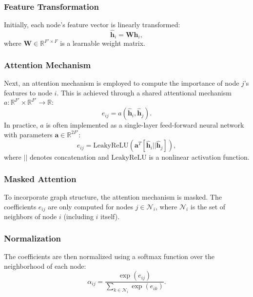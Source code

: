 \documentclass[11pt]{article}
\begin{document}
	\subsubsection{Feature Transformation}
	Initially, each node's feature vector is linearly transformed:
	\begin{equation}
		\hat{\mathbf{h}}_i = \mathbf{W} \mathbf{h}_i,
	\end{equation}
	where $\mathbf{W} \in \mathbb{R}^{F' \times F}$ is a learnable weight matrix.
	
	\subsubsection{Attention Mechanism}
	Next, an attention mechanism is employed to compute the importance of node $j$'s features to node $i$. This is achieved through a shared attentional mechanism $a: \mathbb{R}^{F'} \times \mathbb{R}^{F'} \rightarrow \mathbb{R}$:
	\begin{equation}
		e_{ij} = a(\hat{\mathbf{h}}_i, \hat{\mathbf{h}}_j).
	\end{equation}
	In practice, $a$ is often implemented as a single-layer feed-forward neural network with parameters $\mathbf{a} \in \mathbb{R}^{2F'}$:
	\begin{equation}
		e_{ij} = \text{LeakyReLU}\left( \mathbf{a}^T [\hat{\mathbf{h}}_i || \hat{\mathbf{h}}_j] \right),
	\end{equation}
	where $||$ denotes concatenation and $\text{LeakyReLU}$ is a nonlinear activation function.
	
	\subsubsection{Masked Attention}
	To incorporate graph structure, the attention mechanism is masked. The coefficients $e_{ij}$ are only computed for nodes $j \in \mathcal{N}_i$, where $\mathcal{N}_i$ is the set of neighbors of node $i$ (including $i$ itself).
	
	\subsubsection{Normalization}
	The coefficients are then normalized using a softmax function over the neighborhood of each node:
	\begin{equation}
		\alpha_{ij} = \frac{\exp(e_{ij})}{\sum_{k \in \mathcal{N}_i} \exp(e_{ik})}.
	\end{equation}
	
\end{document}
